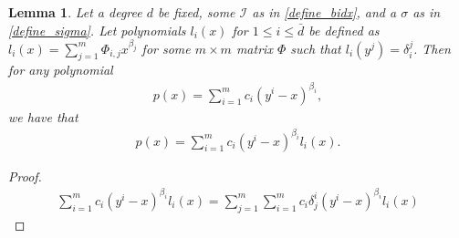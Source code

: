 \documentclass{article}
\newtheorem{lemma}[theorem]{Lemma}
\theoremstyle{case}
\newcommand{\bidx}{{\mathcal I}}
\begin{document}
\begin{lemma}
Let a degree $d$ be fixed, some $\bidx$ as in \cref{define_bidx}, and a $\sigma$ as in \cref{define_sigma}.
Let polynomials $l_i(x)$ for $1\le i\le \bar d$ be defined as 
$l_i(x) = \sum_{j=1}^m\Phi_{i, j}x^{\beta_j}$ for some $m\times m$ matrix $\Phi$ such that
$l_i(y^j) = \delta_i^j$.
Then for any polynomial
\begin{align*}
p(x) = \sum_{i=1}^m c_i (y^i - x)^{\beta_i},
\end{align*}
we have that 
\begin{align*}
p(x) = \sum_{i=1}^m c_i (y^i - x)^{\beta_i} l_i(x).
\end{align*}
\end{lemma}

\begin{proof}

\begin{align*}
\sum_{i=1}^m c_i (y^i - x)^{\beta_i} l_i(x)
= \sum_{j=1}^m\sum_{i=1}^m c_i \delta_j^i(y^i - x)^{\beta_i} l_i(x) 
\end{align*}

\end{proof}
\end{document}
